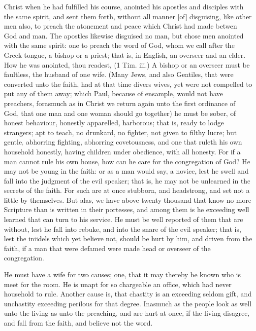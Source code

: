 Christ when he had fulfilled his course, anointed his 
apostles and disciples with the same spirit, and sent them 
forth, without all manner [of] disguising, like other men 
also, to preach the atonement and peace which Christ had 
made betwen God and man. The apostles likewise disguised
no man, but chose men anointed with the same 
spirit: one to preach the word of God, whom we call 
after the Greek tongue, a bishop or a priest; that is, in 
English, an overseer and an elder. How he was anointed, 
thou readest, (1 Tim. iii.) A bishop or an overseer must 
be faultless, the husband of one wife. (Many Jews, and 
also Gentiles, that were converted unto the faith, had at 
that time divers wives, yet were not compelled to put any 
of them away; which Paul, because of ensample, would 
not have preachers, forasmuch as in Christ we return 
again unto the first ordinance of God, that one man and 
one woman should go together) he must be sober, of 
honest behaviour, honestly apparelled, harborous; that is, 
ready to lodge strangers; apt to teach, no drunkard, 
no fighter, not given to filthy lucre; but gentle, abhorring
fighting, abhorring covetousness, and one that 
ruleth his own household honestly, having children under 
obedience, with all honesty. For if a man cannot rule his 
own house, how can he care for the congregation of God? 
He may not be young in the faith: or as a man would 
say, a novice, lest he swell and fall into the judgment of 
the evil speaker; that is, he may not be unlearned in the 
secrets of the faith. For such are at once stubborn, and 
headstrong, and set not a little by themselves. But alas, 
we have above twenty thousand that know no more Scripture
than is written in their portesses, and among them is 
he exceeding well learned that can turn to his service. 
He must be well reported of them that are without, lest 
he fall into rebuke, and into the snare of the evil speaker; 
that is, lest the iniidels which yet believe not, should be 
hurt by him, and driven from the faith, if a man that were 
defamed were made head or overseer of the congregation. 

He must have a wife for two causes; one, that it may 
thereby be known who is meet for the room. He is unapt 
for so chargeable an office, which had never household to 
rule. Another cause is, that chastity is an exceeding 
seldom gift, and unchastity exceeding perilous for that 
degree. Inasmuch as the people look as well unto the 
living as unto the preaching, and are hurt at once, if the 
living disagree, and fall from the faith, and believe not 
the word. 

